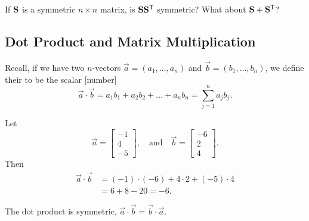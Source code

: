\begin{exercise}
If $\mathbf{S}$ is a symmetric $n\times n$ matrix, is
$\mathbf{S}\mathbf{S}^{\mathsf{T}}$ symmetric? What about $\mathbf{S}+\mathbf{S}^{\mathsf{T}}$?
\end{exercise}

\subsection{Dot Product and Matrix Multiplication}

\begin{definition}
Recall, if we have two $n$-vectors $\vec{a}=(a_{1},\dots,a_{n})$ and
$\vec{b}=(b_{1},\dots,b_{n})$, we define their  to
be the scalar [number]
\begin{equation}
\vec{a}\cdot\vec{b} = a_{1}b_{1} + a_{2}b_{2} + \dots + a_{n}b_{n} = \sum^{n}_{j=1}a_{j}b_{j}.
\end{equation}
\end{definition}

\begin{example}
  Let
  \begin{equation}
\vec{a} = \begin{bmatrix}-1\\4\\-5
\end{bmatrix},\quad\mbox{and}\quad\vec{b}=\begin{bmatrix}
-6\\2\\4
\end{bmatrix}.
  \end{equation}
  Then
  \begin{equation}
    \begin{split}
    \vec{a}\cdot\vec{b} &= (-1)\cdot(-6) + 4\cdot2 + (-5)\cdot 4\\
    &= 6+8-20 = -6.
    \end{split}
  \end{equation}
\end{example}

\begin{proposition}
The dot product is symmetric, $\vec{a}\cdot\vec{b}=\vec{b}\cdot\vec{a}$.
\end{proposition}

